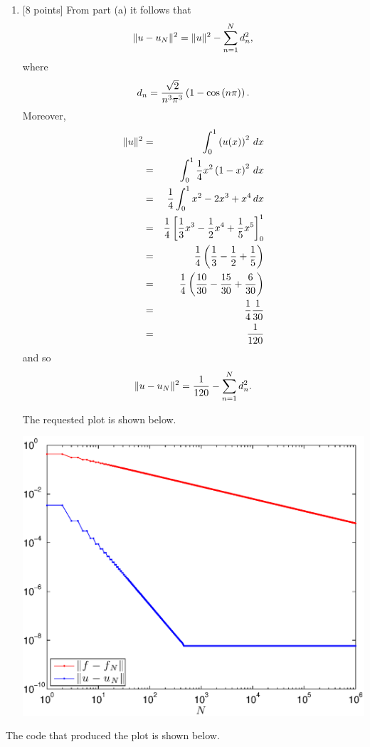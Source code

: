 \begin{solution}
\begin{enumerate}
\item {[8 points]} From part (a) it follows that
\[
\|u-u_N\|^2 = \|u\|^2 - \sum_{n=1}^N d_n^2,
\]
where
\[
d_n={\sqrt{2} \over n^3\pi^3}\left(1-\cos\left(n\pi\right)\right).
\]
Moreover,
\begin{eqnarray*}
\|u\|^2&=&\int_0^1\left(u(x)\right)^2\,dx
\\
&=&\int_0^1{1\over 4}x^2\left(1-x\right)^2\,dx
\\
&=&{1\over 4}\int_0^1x^2-2x^3+x^4\,dx
\\
&=&{1\over 4}\left[{1\over 3}x^3-{1\over 2}x^4+{1\over 5}x^5\right]_0^1
\\
&=&{1\over 4}\left({1\over 3}-{1\over 2}+{1\over 5}\right)
\\
&=&{1\over 4}\left({10\over 30}-{15\over 30}+{6\over 30}\right)
\\
&=&{1\over 4}{1\over 30}
\\
&=&{1\over 120}
\end{eqnarray*}
and so
\[
\|u-u_N\|^2 = {1\over 120} - \sum_{n=1}^N d_n^2.
\]

The requested plot is shown below. 

\begin{center}\includegraphics[scale=0.7]{fourerr}\end{center}
\end{enumerate}

The code that produced the plot is shown below.



\end{solution}
